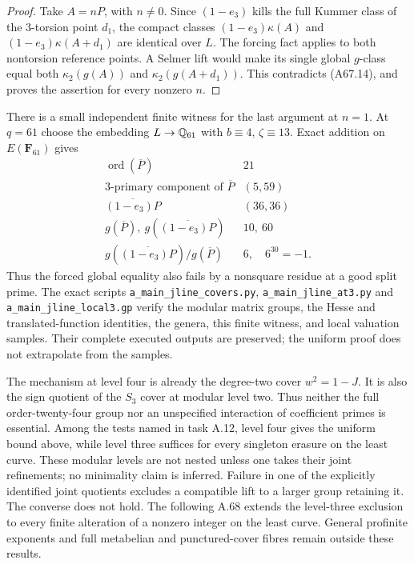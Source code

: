 \begin{proof}
Take $A=nP$, with $n\ne0$.
Since $(1-e_3)$ kills the
full Kummer class of the
$3$-torsion point $d_1$,
the compact classes
$(1-e_3)\kappa(A)$ and
$(1-e_3)\kappa(A+d_1)$
are identical over $L$.
The forcing fact applies
to both nontorsion reference
points. A Selmer lift would
make its single global
$g$-class equal both
$\kappa_2(g(A))$ and
$\kappa_2(g(A+d_1))$.
This contradicts (A67.14),
and proves the assertion
for every nonzero $n$.
\end{proof}

There is a small independent finite
witness for the last argument at
$n=1$. At $q=61$ choose the
embedding $L\to\mathbb Q_{61}$ with
$b\equiv4$, $\zeta\equiv13$.
Exact addition on $E(\mathbf F_{61})$
gives
\[
\begin{array}{c|c}
 \operatorname{ord}(\overline P)&21\\
 \text{$3$-primary component of }\overline P&(5,59)\\
 \overline{(1-e_3)P}&(36,36)\\
 g(\overline P),\ g(\overline{(1-e_3)P})&10,\ 60\\
 g(\overline{(1-e_3)P})/g(\overline P)&6,\quad6^{30}=-1.
\end{array}
\tag{A67.15}
\]
Thus the forced global equality also
fails by a nonsquare residue at a
good split prime. The exact scripts
\texttt{a\_main\_jline\_covers.py},
\texttt{a\_main\_jline\_at3.py} and
\texttt{a\_main\_jline\_local3.gp}
verify the modular matrix groups,
the Hesse and translated-function
identities, the genera, this finite
witness, and local valuation samples.
Their complete executed outputs
are preserved; the uniform proof
does not extrapolate from the samples.

The mechanism at level four is
already the degree-two cover
$w^2=1-J$. It is also the sign
quotient of the $S_3$ cover at
modular level two. Thus neither
the full order-twenty-four group
nor an unspecified interaction
of coefficient primes is
essential. Among the tests named
in task A.12, level four gives
the uniform bound above, while
level three suffices for every
singleton erasure on the least
curve. These modular levels
are not nested unless one takes
their joint refinements; no
minimality claim is inferred.
Failure in one of the explicitly
identified joint quotients
excludes a compatible lift to
a larger group retaining it.
The converse does not hold.
The following A.68 extends the
level-three exclusion to every
finite alteration of a nonzero
integer on the least curve.
General profinite exponents
and full metabelian and
punctured-cover fibres remain
outside these results.
